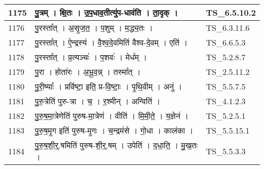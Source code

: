 \documentclass[17pt]{extarticle}
\begin{document}
\begin{longtable}{||p{0.4in}||p{4.9in}||p{0.9in}||}
    \hline
        
    1175 & पु॒त्रम्   ।   क्षि॒तः   ।   उ॒प॒धाव॒तीत्यु॑प{-}धाव॑ति   ।   ता॒दृक्   ।    & TS\_6.5.10.2       \\
    
    \hline
        
    1176 & पु॒रस्ता᳚त्   ।   अ॒सृ॒ज॒त॒   ।   प॒शुम्   ।   म॒द्ध्य॒तः   ।    & TS\_6.3.11.6       \\
    
    \hline
        
    1177 & पु॒रस्ता᳚त्   ।   ऐ॒न्द्रस्य॑   ।   वै॒श्व॒दे॒वमिति॑ वैश्व{-}दे॒वम्   ।   एति॑   ।    & TS\_6.6.5.3       \\
    
    \hline
        
    1178 & पु॒रस्ता᳚त्   ।   प्र॒त्यञ्चः॑   ।   प॒शवः॑   ।   मेध᳚म्   ।    & TS\_5.2.8.7       \\
    
    \hline
        
    1179 & पु॒रा   ।   होता॑रः   ।   अ॒भू॒व॒न्न्   ।   तस्मा᳚त्   ।    & TS\_2.5.11.2       \\
    
    \hline
        
    1180 & पु॒री॒ष्याः᳚   ।   प्रवि॑ष्टा॒ इति॒ प्र{-}वि॒ष्टाः॒   ।   पृ॒थि॒वीम्   ।   अनु॑   ।    & TS\_5.5.7.5       \\
    
    \hline
        
    1181 & पु॒रु॒त्रेति॑ पुरु{-}त्रा   ।   च॒   ।   र॒श्मीन्   ।   अन्विति॑   ।    & TS\_4.1.2.3       \\
    
    \hline
        
    1182 & पु॒रु॒ष॒मा॒त्रेणेति॑ पुरुष{-}मा॒त्रेण॑   ।   वीति॑   ।   मि॒मी॒ते॒   ।   य॒ज्ञेन॑   ।    & TS\_5.2.5.1       \\
    
    \hline
        
    1183 & पु॒रु॒ष॒मृ॒ग इति॑ पुरुष{-}मृ॒गः   ।   च॒न्द्रम॑से   ।   गो॒धा   ।   काल॑का   ।    & TS\_5.5.15.1       \\
    
    \hline
        
    1184 & पु॒रु॒ष॒शी॒र्॒.षमिति॑ पुरुष{-}शी॒र्॒.षम्   ।   उपेति॑   ।   द॒धा॒ति॒   ।   मु॒ख॒तः   ।    & TS\_5.5.3.3       \\
    
    \hline
        

\end{longtable}
\end{document}
